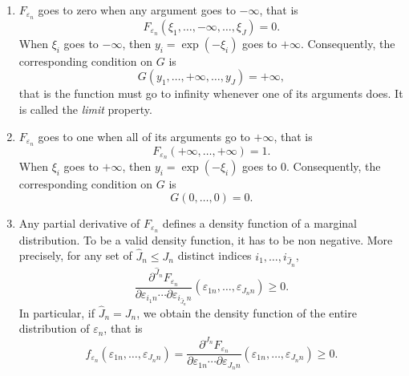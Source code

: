 \documentclass[12pt,a4paper]{article}
\begin{document}
\begin{enumerate}
\item $F_{\varepsilon_n}$ goes to zero when any  argument goes to $-\infty$, that is
\[
 F_{\varepsilon_n}(\xi_{1},\ldots,-\infty,\ldots,\xi_{J}) = 0.
\]
When $\xi_{i}$ goes to $-\infty$, then $y_{i}=\exp(-\xi_{i})$ goes to $+\infty$.
Consequently, the corresponding condition on $G$ is 
\begin{equation}
\label{eq:limitProperty}
 G(y_{1},\ldots,+\infty,\ldots,y_{J}) = +\infty,
\end{equation}
that is the function must go to infinity whenever one of its arguments does. It is called the \emph{limit} property.
\item  $F_{\varepsilon_n}$ goes to one when all of its arguments go to $+\infty$, that is
\[
F_{\varepsilon_n}(+\infty,\ldots,+\infty) = 1.
\]
When $\xi_{i}$ goes to $+\infty$, then $y_{i}=\exp(-\xi_{i})$ goes to $0$.
Consequently, the corresponding condition on $G$ is 
\begin{equation}
\label{eq:G0=0}
G(0,\ldots, 0) =  0.
\end{equation}
\item Any partial derivative of $F_{\varepsilon_n}$ defines a density
  function of a marginal distribution. To be a valid density function, it has to be non negative. More precisely, for any set of $\widehat{J}_n \leq J_n$
distinct indices $i_1,\dots,i_{\widehat{J}_n}$,
\[
 \frac{\partial^{\widehat{J}_n} F_{\varepsilon_n}}{\partial \varepsilon_{i_1 n} \cdots \partial \varepsilon_{i_{\widehat{J}_n}n}}(\varepsilon_{1n}, \ldots,\varepsilon_{{J_n}n}) \geq 0.
\]
In particular, if $\widehat{J}_n = J_n$, we obtain the density function of the entire distribution of $\varepsilon_n$, that is
\[
f_{\varepsilon_n}(\varepsilon_{1n}, \ldots,\varepsilon_{{J_n}n}) = \frac{\partial^{J_n} F_{\varepsilon_n}}{\partial \varepsilon_{1n} \cdots\partial  \varepsilon_{{J_n}n}}(\varepsilon_{1n}, \ldots,\varepsilon_{{J_n}n}) \geq 0.
\]


\end{enumerate}
\end{document}
